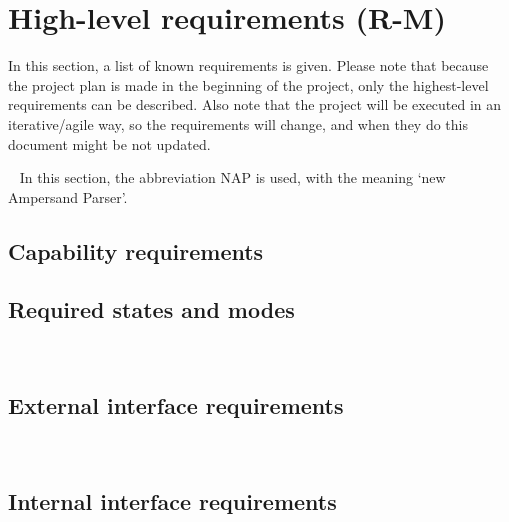 \section{High-level requirements (R-M)}
\label{sec:requirements}
In this section, a list of known requirements is given.
Please note that because the project plan is made in the beginning of the project, only the highest-level requirements can be described.
Also note that the project will be executed in an iterative/agile way, so the requirements will change, and when they do this document might be not updated.

~\newline\noindent
In this section, the abbreviation NAP is used, with the meaning `new Ampersand Parser'.
%

\subsection{Capability requirements}

\subsection{Required states and modes}
\\


\subsection{External interface requirements}
\\

%

\subsection{Internal interface requirements}

